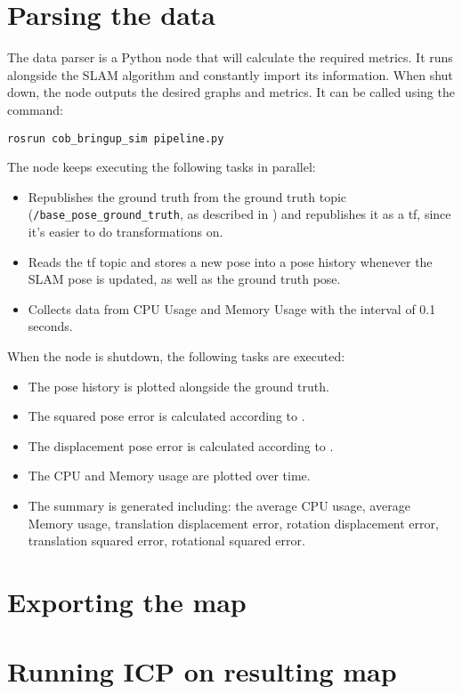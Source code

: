 \section{Parsing the data}

The data parser is a Python node that will calculate the required metrics. It runs alongside the SLAM algorithm and constantly import its information. When shut down, the node outputs the desired graphs and metrics. It can be called using the command:

\begin{verbatim}
rosrun cob_bringup_sim pipeline.py
\end{verbatim}

The node keeps executing the following tasks in parallel:

\begin{itemize}
    \item Republishes the ground truth from the ground truth topic (\texttt{/base\_pose\_ground\_truth}, as described in ) and republishes it as a tf, since it's easier to do transformations on.
    \item Reads the tf topic and stores a new pose into a pose history whenever the SLAM pose is updated, as well as the ground truth pose.
    \item Collects data from CPU Usage and Memory Usage with the interval of 0.1 seconds.
\end{itemize}

When the node is shutdown, the following tasks are executed:

\begin{itemize}
    \item The pose history is plotted alongside the ground truth.
    \item The squared pose error is calculated according to .
    \item The displacement pose error is calculated according to .
    \item The CPU and Memory usage are plotted over time.
    \item The summary is generated including: the average CPU usage, average Memory usage, translation displacement error, rotation displacement error, translation squared error, rotational squared error.
\end{itemize}

\section{Exporting the map}

\section{Running ICP on resulting map}